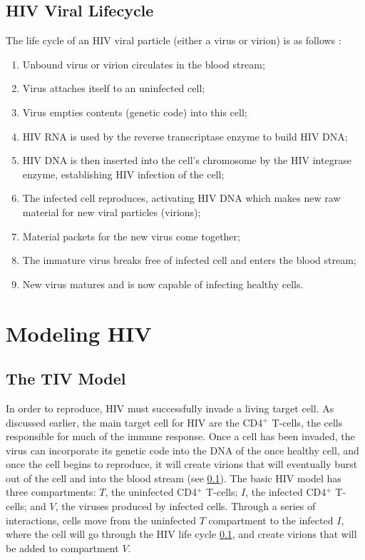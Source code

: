 \documentclass[letterpaper, 11 pt, conference]{ieeeconf}
\begin{document}
\subsection{HIV Viral Lifecycle} \label{Viral Life Cycle}
The life cycle of an HIV viral particle (either a virus or virion) is as follows \cite{HIVlifeCycle}: 
\begin{enumerate}
    \item Unbound virus or virion circulates in the blood stream;
    \item Virus attaches itself to an uninfected cell;
    \item Virus empties contents (genetic code) into this cell;
    \item HIV RNA is used by the reverse transcriptase enzyme to build HIV DNA;
    \item HIV DNA is then inserted into the cell's chromosome by the HIV integrase enzyme, establishing HIV infection of the cell;
    \item The infected cell reproduces, activating HIV DNA which makes new raw material for new viral particles (virions);
    \item Material packets for the new virus come together;
    \item The immature virus breaks free of infected cell and enters the blood stream;
    \item New virus matures and is now capable of infecting healthy cells.
\end{enumerate}


\section{Modeling HIV}

\subsection{The TIV Model}
In order to reproduce, HIV must successfully invade a living target cell. As discussed earlier, the main target cell for HIV are the CD4$^{+}$ T-cells, the cells responsible for much of the immune response. Once a cell has been invaded, the virus can incorporate its genetic code into the DNA of the once healthy cell, and once the cell begins to reproduce, it will create virions that will eventually burst out of the cell and into the blood stream (see \ref{Viral Life Cycle}). The basic HIV model has three compartments: $T$, the uninfected CD4$^{+}$ T-cells; $I$, the infected CD4$^{+}$ T-cells; and $V$, the viruses produced by infected cells. Through a series of interactions, cells move from the uninfected $T$ compartment to the infected $I$, where the cell will go through the HIV life cycle \ref{Viral Life Cycle},  and create virions that will be added to compartment $V$. 
\end{document}
